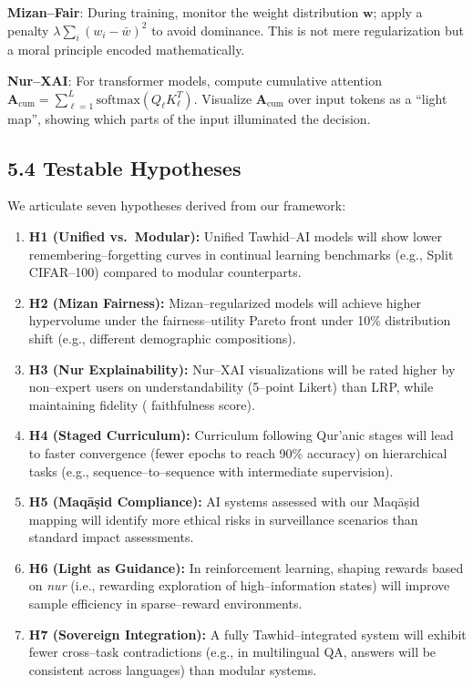\documentclass[12pt,twocolumn]{article}
\begin{document}
\textbf{Mizan--Fair}: During training, monitor the weight distribution $\mathbf{w}$; apply a penalty $\lambda \sum_i (w_i - \bar{w})^2$ to avoid dominance. This is not mere regularization but a moral principle encoded mathematically.

\textbf{Nur--XAI}: For transformer models, compute cumulative attention $\mathbf{A}_{\text{cum}} = \sum_{\ell=1}^L \text{softmax}(Q_\ell K_\ell^T)$. Visualize $\mathbf{A}_{\text{cum}}$ over input tokens as a ``light map'', showing which parts of the input illuminated the decision.

\subsection*{5.4 Testable Hypotheses}
We articulate seven hypotheses derived from our framework:
\begin{enumerate}[leftmargin=*, label=\textbf{H\arabic*.}]
\item \textbf{H1 (Unified vs.\ Modular):} Unified Tawhid--AI models will show lower remembering--forgetting curves in continual learning benchmarks (e.g., Split CIFAR--100) compared to modular counterparts.
\item \textbf{H2 (Mizan Fairness):} Mizan--regularized models will achieve higher hypervolume under the fairness--utility Pareto front under 10\% distribution shift (e.g., different demographic compositions).
\item \textbf{H3 (Nur Explainability):} Nur--XAI visualizations will be rated higher by non--expert users on understandability (5--point Likert) than LRP, while maintaining fidelity ( faithfulness score).
\item \textbf{H4 (Staged Curriculum):} Curriculum following Qur'anic stages will lead to faster convergence (fewer epochs to reach 90\% accuracy) on hierarchical tasks (e.g., sequence--to--sequence with intermediate supervision).
\item \textbf{H5 (Maqāṣid Compliance):} AI systems assessed with our Maqāṣid mapping will identify more ethical risks in surveillance scenarios than standard impact assessments.
\item \textbf{H6 (Light as Guidance):} In reinforcement learning, shaping rewards based on \emph{nur} (i.e., rewarding exploration of high--information states) will improve sample efficiency in sparse--reward environments.
\item \textbf{H7 (Sovereign Integration):} A fully Tawhid--integrated system will exhibit fewer cross--task contradictions (e.g., in multilingual QA, answers will be consistent across languages) than modular systems.
\end{enumerate}
\end{document}
